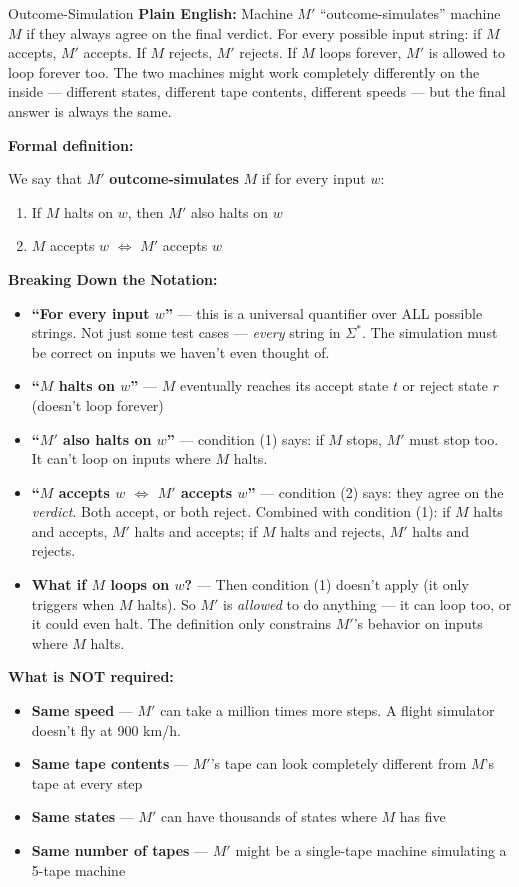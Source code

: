 \begin{definitionbox}{Outcome-Simulation}
\textbf{Plain English:}
Machine $M'$ ``outcome-simulates'' machine $M$ if they always agree on the
final verdict. For every possible input string: if $M$ accepts, $M'$ accepts.
If $M$ rejects, $M'$ rejects. If $M$ loops forever, $M'$ is allowed to loop
forever too. The two machines might work completely differently on the inside
--- different states, different tape contents, different speeds --- but the
final answer is always the same.

\textbf{Formal definition:}

We say that $M'$ \textbf{outcome-simulates} $M$ if for every input $w$:
\begin{enumerate}[nosep]
\item If $M$ halts on $w$, then $M'$ also halts on $w$
\item $M$ accepts $w$ $\iff$ $M'$ accepts $w$
\end{enumerate}

\textbf{Breaking Down the Notation:}
\begin{itemize}[nosep]
\item \textbf{``For every input $w$''} --- this is a universal quantifier over
  ALL possible strings. Not just some test cases --- \emph{every} string in
  $\Sigma^*$. The simulation must be correct on inputs we haven't even thought of.
\item \textbf{``$M$ halts on $w$''} --- $M$ eventually reaches its accept state
  $t$ or reject state $r$ (doesn't loop forever)
\item \textbf{``$M'$ also halts on $w$''} --- condition (1) says: if $M$ stops,
  $M'$ must stop too. It can't loop on inputs where $M$ halts.
\item \textbf{``$M$ accepts $w$ $\iff$ $M'$ accepts $w$''} --- condition (2) says:
  they agree on the \emph{verdict}. Both accept, or both reject. Combined with
  condition (1): if $M$ halts and accepts, $M'$ halts and accepts; if $M$ halts
  and rejects, $M'$ halts and rejects.
\item \textbf{What if $M$ loops on $w$?} --- Then condition (1) doesn't apply
  (it only triggers when $M$ halts). So $M'$ is \emph{allowed} to do anything
  --- it can loop too, or it could even halt. The definition only constrains
  $M'$'s behavior on inputs where $M$ halts.
\end{itemize}

\textbf{What is NOT required:}
\begin{itemize}[nosep]
\item \textbf{Same speed} --- $M'$ can take a million times more steps. A
  flight simulator doesn't fly at 900 km/h.
\item \textbf{Same tape contents} --- $M'$'s tape can look completely different
  from $M$'s tape at every step
\item \textbf{Same states} --- $M'$ can have thousands of states where $M$ has
  five
\item \textbf{Same number of tapes} --- $M'$ might be a single-tape machine
  simulating a 5-tape machine
\end{itemize}
\end{definitionbox}

